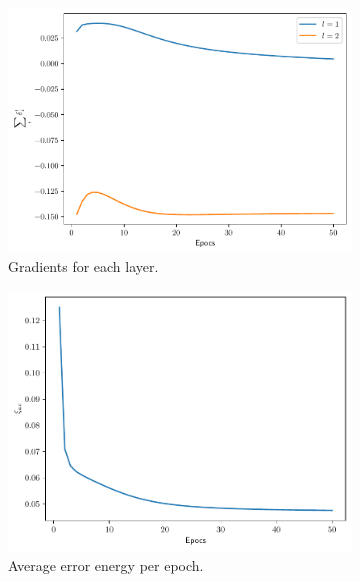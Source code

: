 \documentclass[conference]{IEEEtran}
\theoremstyle{definition}
\theoremstyle{remark}
\theoremstyle{remark}
\begin{document}
\begin{figure}
    \centering
    \begin{subfigure}[b]{0.32\textwidth}
        \centering
        \includegraphics[width=\textwidth]{figs/2-0.2-emb-gradients.pdf}
        \caption{Gradients for each layer.}
    \end{subfigure}
    \begin{subfigure}[b]{0.32\textwidth}
        \centering
        \includegraphics[width=\textwidth]{figs/2-0.2-emb-error.pdf}
        \caption{Average error energy per epoch.}
    \end{subfigure}
    \begin{subfigure}[b]{0.32\textwidth}
        \centering

\end{subfigure}
\end{figure}
\end{document}
